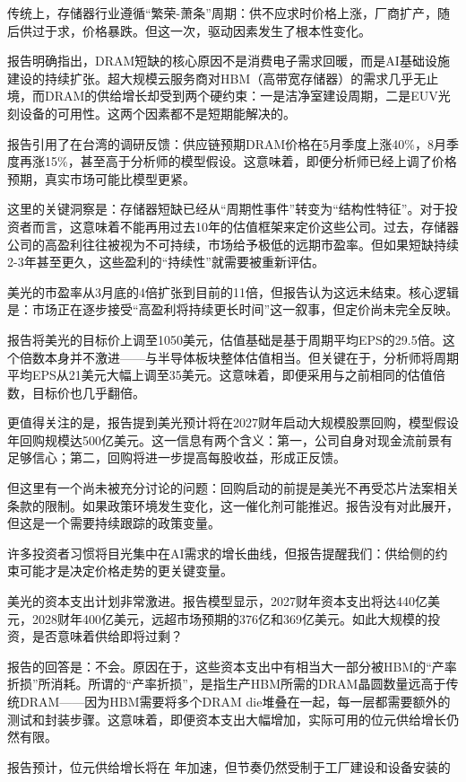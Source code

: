 \documentclass[11pt]{ctexart}
\begin{document}
传统上，存储器行业遵循“繁荣-萧条”周期：供不应求时价格上涨，厂商扩产，随后供过于求，价格暴跌。但这一次，驱动因素发生了根本性变化。

报告明确指出，DRAM短缺的核心原因不是消费电子需求回暖，而是AI基础设施建设的持续扩张。超大规模云服务商对HBM（高带宽存储器）的需求几乎无止境，而DRAM的供给增长却受到两个硬约束：一是洁净室建设周期，二是EUV光刻设备的可用性。这两个因素都不是短期能解决的。

报告引用了在台湾的调研反馈：供应链预期DRAM价格在5月季度上涨40\%，8月季度再涨15\%，甚至高于分析师的模型假设。这意味着，即便分析师已经上调了价格预期，真实市场可能比模型更紧。

这里的关键洞察是：存储器短缺已经从“周期性事件”转变为“结构性特征”。对于投资者而言，这意味着不能再用过去10年的估值框架来定价这些公司。过去，存储器公司的高盈利往往被视为不可持续，市场给予极低的远期市盈率。但如果短缺持续2-3年甚至更久，这些盈利的“持续性”就需要被重新评估。

美光的市盈率从3月底的4倍扩张到目前的11倍，但报告认为这远未结束。核心逻辑是：市场正在逐步接受“高盈利将持续更长时间”这一叙事，但定价尚未完全反映。

报告将美光的目标价上调至1050美元，估值基础是基于周期平均EPS的29.5倍。这个倍数本身并不激进——与半导体板块整体估值相当。但关键在于，分析师将周期平均EPS从21美元大幅上调至35美元。这意味着，即便采用与之前相同的估值倍数，目标价也几乎翻倍。

更值得关注的是，报告提到美光预计将在2027财年启动大规模股票回购，模型假设 年回购规模达500亿美元。这一信息有两个含义：第一，公司自身对现金流前景有足够信心；第二，回购将进一步提高每股收益，形成正反馈。

但这里有一个尚未被充分讨论的问题：回购启动的前提是美光不再受芯片法案相关条款的限制。如果政策环境发生变化，这一催化剂可能推迟。报告没有对此展开，但这是一个需要持续跟踪的政策变量。

许多投资者习惯将目光集中在AI需求的增长曲线，但报告提醒我们：供给侧的约束可能才是决定价格走势的更关键变量。

美光的资本支出计划非常激进。报告模型显示，2027财年资本支出将达440亿美元，2028财年400亿美元，远超市场预期的376亿和369亿美元。如此大规模的投资，是否意味着供给即将过剩？

报告的回答是：不会。原因在于，这些资本支出中有相当大一部分被HBM的“产率折损”所消耗。所谓的“产率折损”，是指生产HBM所需的DRAM晶圆数量远高于传统DRAM——因为HBM需要将多个DRAM die堆叠在一起，每一层都需要额外的测试和封装步骤。这意味着，即便资本支出大幅增加，实际可用的位元供给增长仍然有限。

报告预计，位元供给增长将在 年加速，但节奏仍然受制于工厂建设和设备安装的
\end{document}
